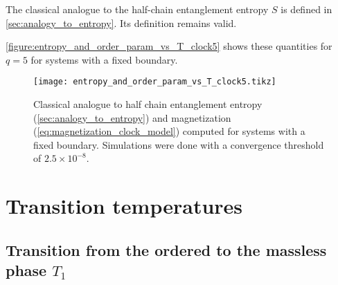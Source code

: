 The classical analogue to the half-chain entanglement entropy $S$ is defined in \autoref{sec:analogy_to_entropy}.
Its definition remains valid.

\autoref{figure:entropy_and_order_param_vs_T_clock5} shows these quantities for $q = 5$ for systems with a fixed
boundary.

\begin{figure}
  \texttt{[image: entropy\_and\_order\_param\_vs\_T\_clock5.tikz]}
  \caption{Classical analogue to half chain entanglement entropy (\autoref{sec:analogy_to_entropy}) and magnetization
  (\autoref{eq:magnetization_clock_model}) computed for systems with a fixed boundary.
  Simulations were done with a convergence threshold of $2.5 \times
  10^{-8}$.}\label{figure:entropy_and_order_param_vs_T_clock5}
\end{figure}

\section{Transition temperatures}
\subsection{Transition from the ordered to the massless phase $T_1$}

